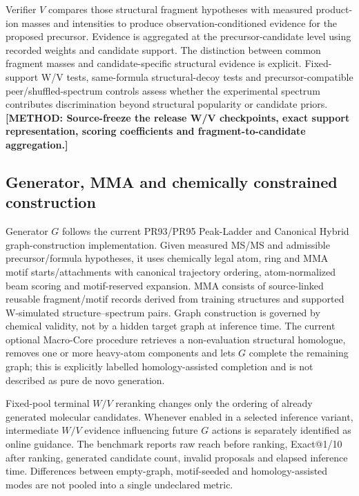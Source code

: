 \documentclass[11pt]{article}
\newcommand{\methodtodo}[1]{\textbf{\textcolor{orbitviolet}{[METHOD: #1]}}}
\begin{document}
Verifier \(V\) compares those structural fragment hypotheses with measured product-ion masses and intensities to produce observation-conditioned evidence for the proposed precursor. Evidence is aggregated at the precursor-candidate level using recorded weights and candidate support. The distinction between common fragment masses and candidate-specific structural evidence is explicit. Fixed-support W/V tests, same-formula structural-decoy tests and precursor-compatible peer/shuffled-spectrum controls assess whether the experimental spectrum contributes discrimination beyond structural popularity or candidate priors. \methodtodo{Source-freeze the release W/V checkpoints, exact support representation, scoring coefficients and fragment-to-candidate aggregation.}

\subsection*{Generator, MMA and chemically constrained construction}
Generator \(G\) follows the current PR93/PR95 Peak-Ladder and Canonical Hybrid graph-construction implementation. Given measured MS/MS and admissible precursor/formula hypotheses, it uses chemically legal atom, ring and MMA motif starts/attachments with canonical trajectory ordering, atom-normalized beam scoring and motif-reserved expansion. MMA consists of source-linked reusable fragment/motif records derived from training structures and supported W-simulated structure–spectrum pairs. Graph construction is governed by chemical validity, not by a hidden target graph at inference time. The current optional Macro-Core procedure retrieves a non-evaluation structural homologue, removes one or more heavy-atom components and lets \(G\) complete the remaining graph; this is explicitly labelled homology-assisted completion and is not described as pure de novo generation.

Fixed-pool terminal \(W/V\) reranking changes only the ordering of already generated molecular candidates. Whenever enabled in a selected inference variant, intermediate \(W/V\) evidence influencing future \(G\) actions is separately identified as online guidance. The benchmark reports raw reach before ranking, Exact@1/10 after ranking, generated candidate count, invalid proposals and elapsed inference time. Differences between empty-graph, motif-seeded and homology-assisted modes are not pooled into a single undeclared metric.
\end{document}
